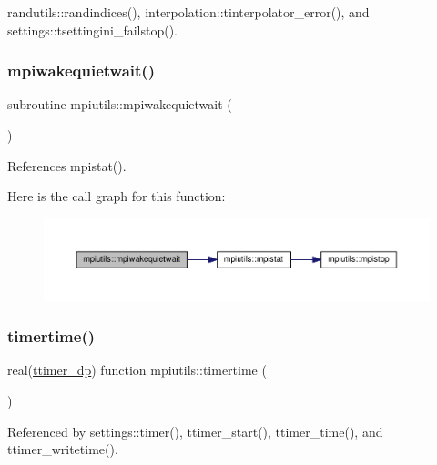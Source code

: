 randutils\+::randindices(), interpolation\+::tinterpolator\+\_\+error(), and settings\+::tsettingini\+\_\+failstop().

\mbox{\label{namespacempiutils_a86ebeabf362ba28efbc4eae836b533bb}} 
\subsubsection{\texorpdfstring{mpiwakequietwait()}{mpiwakequietwait()}}
{\footnotesize\ttfamily subroutine mpiutils\+::mpiwakequietwait (\begin{DoxyParamCaption}{ }\end{DoxyParamCaption})}



References mpistat().

Here is the call graph for this function\+:
\nopagebreak
\begin{figure}[H]
\begin{center}
\leavevmode
\includegraphics[width=350pt]{namespacempiutils_a86ebeabf362ba28efbc4eae836b533bb_cgraph}
\end{center}
\end{figure}
\mbox{\label{namespacempiutils_a22d9c100b7422621acc997902a9856f7}} 
\subsubsection{\texorpdfstring{timertime()}{timertime()}}
{\footnotesize\ttfamily real(\mbox{\hyperlink{namespacempiutils_a29264c4652e8287096a27ca2675edc26}{ttimer\+\_\+dp}}) function mpiutils\+::timertime (\begin{DoxyParamCaption}{ }\end{DoxyParamCaption})}



Referenced by settings\+::timer(), ttimer\+\_\+start(), ttimer\+\_\+time(), and ttimer\+\_\+writetime().

